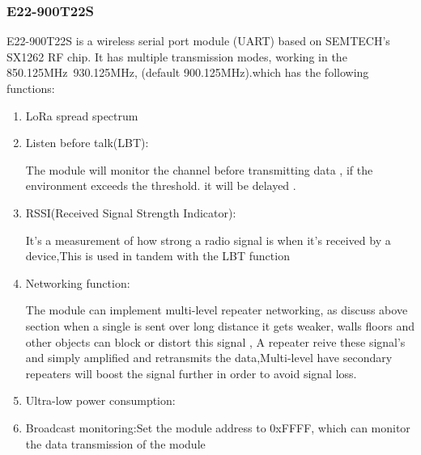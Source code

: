 \subsubsection{E22-900T22S}
E22-900T22S is a wireless serial port module (UART) based on SEMTECH's SX1262 RF chip. It has multiple transmission modes, working in the 850.125MHz~930.125MHz, (default 900.125MHz).which has the following functions:
\begin{enumerate}
    \item LoRa spread spectrum
    \item Listen before talk(LBT):

    The module will monitor the channel  before transmitting data , if the environment exceeds the threshold. it will be delayed .
    \item RSSI(Received Signal Strength Indicator):
    
    It's a measurement of how strong a radio signal is when it's received by a device,This is used in tandem with the LBT function

    \item Networking function: 
    
    The module can implement multi-level repeater networking, 
    as discuss above section when a  single is  sent  over long distance it gets weaker, walls floors and  other objects can block or distort this signal , A repeater reive these signal's and  simply amplified and retransmits the data,Multi-level  have secondary repeaters will boost the signal further in order to avoid signal loss.
    \item Ultra-low power consumption:
    \item Broadcast monitoring:Set the module address to 0xFFFF, which can monitor the data transmission of the module
\end{enumerate}